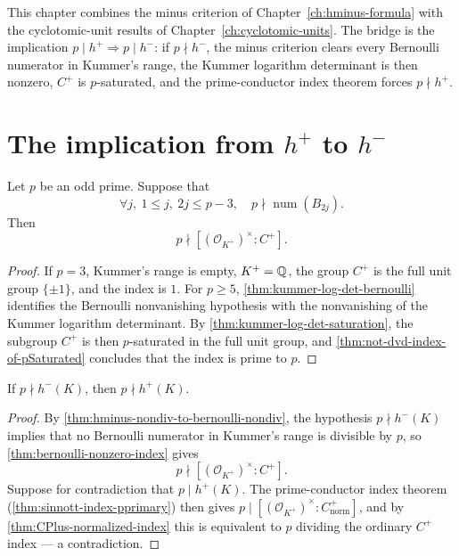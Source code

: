 
This chapter combines the minus criterion of
Chapter~\ref{ch:hminus-formula} with the cyclotomic-unit results of
Chapter~\ref{ch:cyclotomic-units}.  The bridge is the implication
$p \mid h^+ \Rightarrow p \mid h^-$: if $p \nmid h^-$, the minus criterion
clears every Bernoulli numerator in Kummer's range, the Kummer logarithm
determinant is then nonzero, $C^+$ is $p$-saturated, and the
prime-conductor index theorem forces $p \nmid h^+$.

\section{\texorpdfstring{The implication from $h^+$ to $h^-$}{The implication from h-plus to h-minus}}

\begin{theorem}\label{thm:bernoulli-nonzero-index}
  \leanok
Let $p$ be an odd prime.  Suppose that
\[
  \forall j,\ 1\le j,\ 2j\le p-3,\quad
  p\nmid\operatorname{num}(B_{2j}).
\]
Then
\[
  p\nmid[(\mathcal O_{K^+})^\times:C^+].
\]
\end{theorem}
\begin{proof}\leanok
If $p=3$, Kummer's range is empty, $K^+ = \mathbb{Q}$, the group $C^+$ is the full
unit group $\{\pm1\}$, and the index is $1$.  For $p\ge5$,
\cref{thm:kummer-log-det-bernoulli} identifies the Bernoulli nonvanishing
hypothesis with the nonvanishing of the Kummer logarithm determinant.  By
\cref{thm:kummer-log-det-saturation}, the subgroup $C^+$ is then
$p$-saturated in the full unit group, and
\cref{thm:not-dvd-index-of-pSaturated} concludes that the index is prime
to $p$.
\end{proof}

\begin{theorem}\label{thm:not-dvd-hplus-of-not-dvd-hminus-units}
  \leanok
If $p\nmid h^-(K)$, then $p\nmid h^+(K)$.
\end{theorem}
\begin{proof}\leanok
By \cref{thm:hminus-nondiv-to-bernoulli-nondiv}, the hypothesis
$p\nmid h^-(K)$ implies that no Bernoulli numerator in Kummer's range is
divisible by $p$, so \cref{thm:bernoulli-nonzero-index} gives
\[
  p\nmid[(\mathcal O_{K^+})^\times:C^+].
\]
Suppose for contradiction that $p\mid h^+(K)$.  The prime-conductor index
theorem (\cref{thm:sinnott-index-pprimary}) then gives $p \mid
[(\mathcal O_{K^+})^\times:C^+_{\mathrm{norm}}]$, and by
\cref{thm:CPlus-normalized-index} this is equivalent to $p$ dividing the
ordinary $C^+$ index --- a contradiction.
\end{proof}

